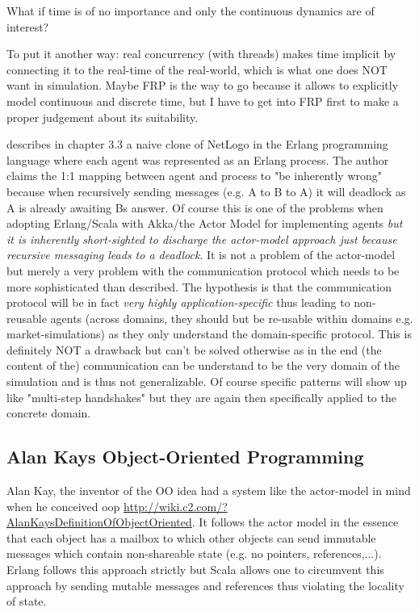 What if time is of no importance and only the continuous dynamics are of interest?

To put it another way: real concurrency (with threads) makes time implicit by connecting it to the real-time of the real-world, which is what one does NOT want in simulation. Maybe FRP is the way to go because it allows to explicitly model continuous and discrete time, but I have to get into FRP first to make a proper judgement about its suitability.

\cite{bezirgiannis_improving_2013} describes in chapter 3.3 a naive clone of NetLogo in the Erlang programming language where each agent was represented as an Erlang process. The author claims the 1:1 mapping between agent and process to "be inherently wrong" because when recursively sending messages (e.g. A to B to A) it will deadlock as A is already awaiting Bs answer. Of course this is one of the problems when adopting Erlang/Scala with Akka/the Actor Model for implementing agents \textit{but it is inherently short-sighted to discharge the actor-model approach just because recursive messaging leads to a deadlock}. It is not a problem of the actor-model but merely a very problem with the communication protocol which needs to be more sophisticated than \cite{bezirgiannis_improving_2013} described. The hypothesis is that the communication protocol will be in fact \textit{very highly application-specific} thus leading to non-reusable agents (across domains, they should but be re-usable within domains e.g. market-simulations) as they only understand the domain-specific protocol. This is definitely NOT a drawback but can't be solved otherwise as in the end (the content of the) communication can be understand to be the very domain of the simulation and is thus not generalizable. Of course specific patterns will show up like "multi-step handshakes" but they are again then specifically applied to the concrete domain.

\subsection{Alan Kays Object-Oriented Programming}
Alan Kay, the inventor of the OO idea had a system like the actor-model in mind when he conceived oop \url{http://wiki.c2.com/?AlanKaysDefinitionOfObjectOriented}. It follows the actor model in the essence that each object has a mailbox to which other objects can send immutable messages which contain non-shareable state (e.g. no pointers, references,...). Erlang follows this approach strictly but Scala allows one to circumvent this approach by sending mutable messages and references thus violating the locality of state.\\

